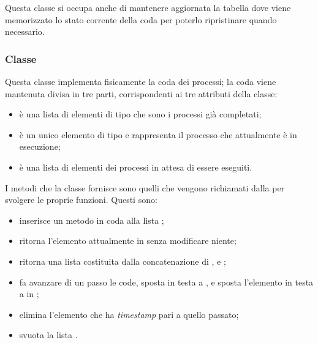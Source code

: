 \documentclass[tesi.tex]{subfiles}
\begin{document}
Questa classe si occupa anche di mantenere aggiornata la tabella
 dove viene memorizzato lo stato corrente della
coda per poterlo ripristinare quando necessario.

\subsubsection{Classe }
\begin{center}
\end{center}
Questa classe implementa fisicamente la coda dei processi; la coda
viene mantenuta divisa in tre parti, corrispondenti ai tre attributi
della classe:
\begin{itemize}
\item {} \`e una lista di elementi di tipo
   che sono i processi gi\`a completati;
\item {} \`e un unico elemento di tipo
   e rappresenta il processo che attualmente \`e
  in esecuzione;
\item {} \`e una lista di elementi dei processi in attesa
  di essere eseguiti.
\end{itemize}

I metodi che la classe fornisce sono quelli che vengono richiamati
dalla  per svolgere le proprie funzioni. Questi
sono:
\begin{itemize}
\item {} inserisce un metodo in coda alla lista ;
\item {} ritorna l'elemento attualmente in 
  senza modificare niente;
\item {} ritorna una lista costituita dalla concatenazione
  di ,  e ;
\item {} fa avanzare di un passo le code, sposta
   in testa a , e sposta l'elemento in testa
  a  in ;\
\item {} elimina l'elemento che ha \emph{timestamp} pari a
  quello passato;
\item {} svuota la lista .
\end{itemize}
\end{document}
